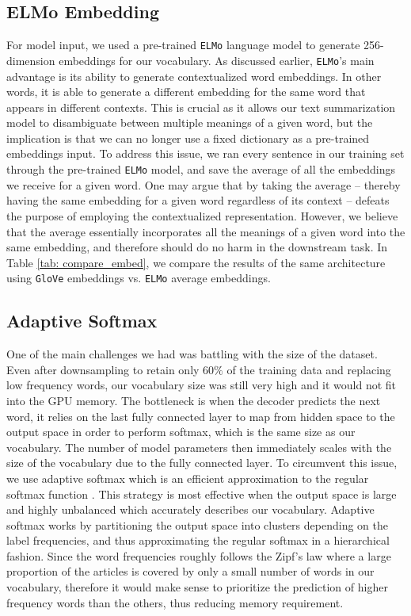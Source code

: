\subsection{ELMo Embedding}
For model input, we used a pre-trained \texttt{ELMo} language model \cite{peters2018deep} to generate 256-dimension embeddings for our vocabulary. As discussed earlier, \texttt{ELMo}'s main advantage is its ability to generate contextualized word embeddings. In other words, it is able to generate a different embedding for the same word that appears in different contexts. This is crucial as it allows our text summarization model to disambiguate between multiple meanings of a given word, but the implication is that we can no longer use a fixed dictionary as a pre-trained embeddings input. To address this issue, we ran every sentence in our training set through the pre-trained \texttt{ELMo} model, and save the average of all the embeddings we receive for a given word. One may argue that by taking the average -- thereby having the same embedding for a given word regardless of its context -- defeats the purpose of employing the contextualized representation. However, we believe that the average essentially incorporates all the meanings of a given word into the same embedding, and therefore should do no harm in the downstream task.  In Table \ref{tab: compare_embed}, we compare the results of the same architecture using \texttt{GloVe} embeddings vs. \texttt{ELMo} average embeddings. 

\subsection{Adaptive Softmax}
One of the main challenges we had was battling with the size of the dataset. Even after downsampling to retain only $60\%$ of the training data and replacing low frequency words, our vocabulary size was still very high and it would not fit into the GPU memory. The bottleneck is when the decoder predicts the next word, it relies on the last fully connected layer to map from hidden space to the output space in order to perform softmax, which is the same size as our vocabulary. The number of model parameters then immediately scales with the size of the vocabulary due to the fully connected layer. To circumvent this issue, we use adaptive softmax which is an efficient approximation to the regular softmax function \cite{grave2016efficient}. This strategy is most effective when the output space is large and highly unbalanced which accurately describes our vocabulary. Adaptive softmax works by partitioning the output space into clusters depending on the label frequencies, and thus approximating the regular softmax in a hierarchical fashion. Since the word frequencies roughly follows the Zipf's law \cite{wilson1949human} where a large proportion of the articles is covered by only a small number of words in our vocabulary, therefore it would make sense to prioritize the prediction of higher frequency words than the others, thus reducing memory requirement.


